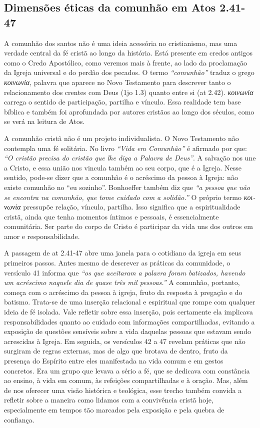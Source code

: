 \subsection{Dimensões éticas da comunhão em Atos 2.41-47}

A comunhão dos santos não é uma ideia acessória no cristianismo, mas uma verdade central da fé cristã ao longo da história. Está presente em credos antigos como o Credo Apostólico, como veremos mais à frente, ao lado da proclamação da Igreja universal e do perdão dos pecados. O termo \textit{``comunhão''} traduz o grego \textit{\foreignlanguage{greek}{κοινωνία}}, palavra que aparece no Novo Testamento para descrever tanto o relacionamento dos crentes com Deus (\gls{1jo} 1.3) quanto entre si (\gls{at} 2.42). \textit{\foreignlanguage{greek}{κοινωνία}} carrega o sentido de participação, partilha e vínculo. Essa realidade tem base bíblica e também foi aprofundada por autores cristãos ao longo dos séculos, como se verá na leitura de Atos.

A comunhão cristã não é um projeto individualista. O Novo Testamento não contempla uma fé solitária. No livro \textit{``Vida em Comunhão''} é afirmado por  que: \textit{``O cristão precisa do cristão que lhe diga a Palavra de Deus''}. A salvação nos une a Cristo, e essa união nos vincula também ao seu corpo, que é a Igreja. Nesse sentido, pode-se dizer que a comunhão é o acréscimo da pessoa à Igreja: não existe comunhão no ``eu sozinho''. Bonhoeffer também diz que \textit{``a pessoa que não se encontra na comunhão, que tome cuidado com a solidão.''} \cite[p.~59]{bonhoeffer1997} O próprio termo \textit{\foreignlanguage{greek}{κοινωνία}} pressupõe relação, vínculo, partilha. Isso significa que a espiritualidade cristã, ainda que tenha momentos íntimos e pessoais, é essencialmente comunitária. Ser parte do corpo de Cristo é participar da vida uns dos outros em amor e responsabilidade.

A passagem de \gls{at} 2.41-47 abre uma janela para o cotidiano da igreja em seus primeiros passos. Antes mesmo de descrever as práticas da comunidade, o versículo 41 informa que \textit{``os que aceitaram a palavra foram batizados, havendo um acréscimo naquele dia de quase três mil pessoas.''} A comunhão, portanto, começa com o acréscimo da pessoa à igreja, fruto da resposta à pregação e do batismo. Trata-se de uma inserção relacional e espiritual que rompe com qualquer ideia de fé isolada. Vale refletir sobre essa inserção, pois certamente ela implicava responsabilidades quanto ao cuidado com informações compartilhadas, evitando a exposição de questões sensíveis sobre a vida daquelas pessoas que estavam sendo acrescidas à Igreja. Em seguida, os versículos 42 a 47 revelam práticas que não surgiram de regras externas, mas de algo que brotava de dentro, fruto da presença do Espírito entre eles manifestada na vida comum e em gestos concretos. Era um grupo que levava a sério a fé, que se dedicava com constância ao ensino, à vida em comum, às refeições compartilhadas e à oração. Mas, além de nos oferecer uma visão histórica e teológica, esse trecho também convida a refletir sobre a maneira como lidamos com a convivência cristã hoje, especialmente em tempos tão marcados pela exposição e pela quebra de confiança.

